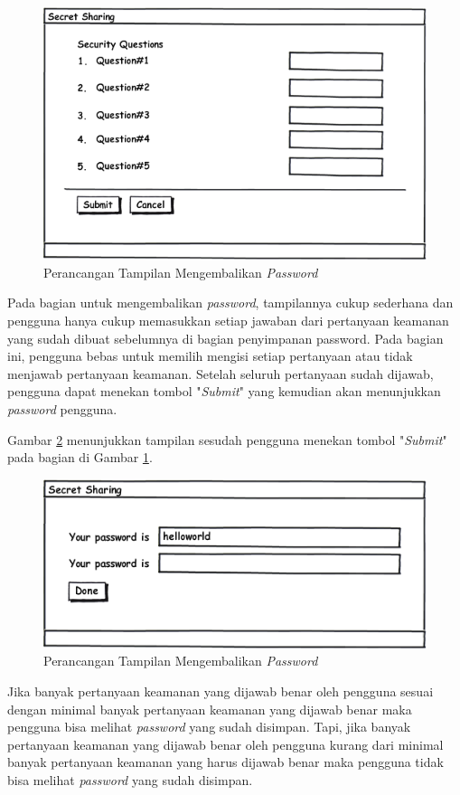 \begin{figure}[H]
	\centerline{\includegraphics[scale=0.5]{Gambar/retrieve_password}}
	\caption{Perancangan Tampilan Mengembalikan \textit{Password}}\label{fig:retrieve_password}
\end{figure}

Pada bagian untuk mengembalikan \textit{password}, tampilannya cukup sederhana dan pengguna hanya cukup memasukkan setiap jawaban dari pertanyaan keamanan yang sudah dibuat sebelumnya di bagian penyimpanan password. Pada bagian ini, pengguna bebas untuk memilih mengisi setiap pertanyaan atau tidak menjawab pertanyaan keamanan. Setelah seluruh pertanyaan sudah dijawab, pengguna dapat menekan tombol "\textit{Submit}" yang kemudian akan menunjukkan \textit{password} pengguna.

Gambar \ref{fig:password} menunjukkan tampilan sesudah pengguna menekan tombol "\textit{Submit}" pada bagian di Gambar \ref{fig:retrieve_password}.

\begin{figure}[H]
	\centerline{\includegraphics[scale=0.5]{Gambar/password}}
	\caption{Perancangan Tampilan Mengembalikan \textit{Password}}\label{fig:password}
\end{figure}

Jika banyak pertanyaan keamanan yang dijawab benar oleh pengguna sesuai dengan minimal banyak pertanyaan keamanan yang dijawab benar maka pengguna bisa melihat \textit{password} yang sudah disimpan. Tapi, jika banyak pertanyaan keamanan yang dijawab benar oleh pengguna kurang dari minimal banyak pertanyaan keamanan yang harus dijawab benar maka pengguna tidak bisa melihat \textit{password} yang sudah disimpan.